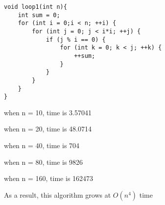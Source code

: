 \documentclass[12pt]{article}
\begin{document}
\begin{enumerate}
\begin{verbatim}
void loop1(int n){
    int sum = 0;
    for (int i = 0;i < n; ++i) {
        for (int j = 0; j < i*i; ++j) {
            if (j % i == 0) {
                for (int k = 0; k < j; ++k) {
                    ++sum;
                }
            }
        }
    }
}
\end{verbatim}
when n = 10, time is 3.57041

when n = 20, time is 48.0714

when n = 40, time is 704

when n = 80, time is 9826

when n = 160, time is 162473

As a result, this algorithm grows at $O(n^4)$ time

\end{enumerate}
\end{document}
